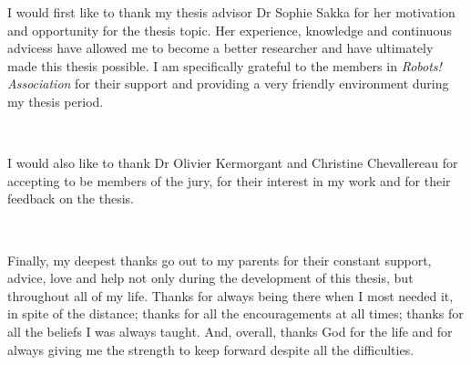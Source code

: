 \documentclass{thesisreport}
\begin{document}
 I would first like to thank my thesis advisor Dr Sophie Sakka for her motivation and opportunity for the thesis topic.
 Her experience, knowledge and continuous advicess have allowed me to become a better researcher and have ultimately made 
 this thesis possible. I am specifically grateful to the members in \textit{Robots! Association} for their support and providing 
 a very friendly environment during my thesis period. 

 ~
 
I would also like to thank Dr Olivier Kermorgant and Christine Chevallereau for accepting to be members of the jury, for their 
interest in my work and for their feedback on the thesis.

~

Finally, my deepest thanks go out to my parents for their constant support, advice, love and help not only during the development 
of this thesis, but throughout all of my life. Thanks for always being there when I most needed it, in spite of the distance; thanks
for all the encouragements at all times; thanks for all the beliefs I was always taught. And, overall, thanks God for the life and 
for always giving me the strength to keep forward despite all the difficulties.

\newpage
 
 
\end{document}
